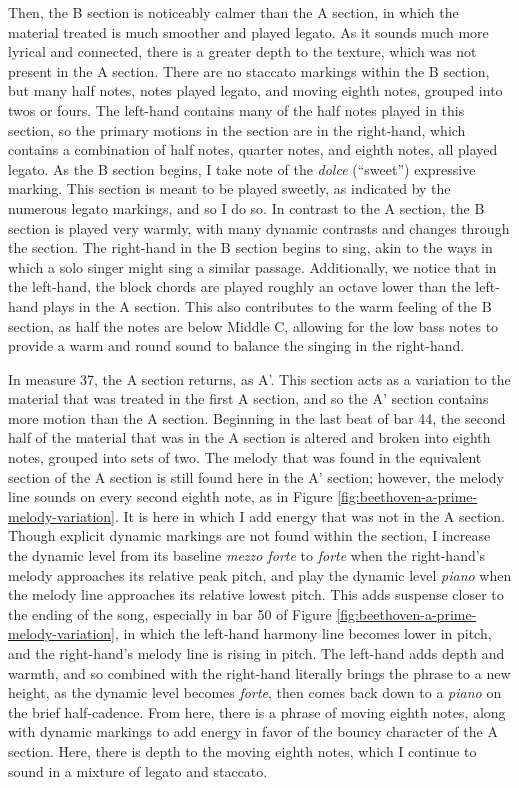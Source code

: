 Then, the B section is noticeably calmer than the A section, in which the material treated is much smoother and played legato. As it sounds much more lyrical and connected, there is a greater depth to the texture, which was not present in the A section. There are no staccato markings within the B section, but many half notes, notes played legato, and moving eighth notes, grouped into twos or fours. The left-hand contains many of the half notes played in this section, so the primary motions in the section are in the right-hand, which contains a combination of half notes, quarter notes, and eighth notes, all played legato. As the B section begins, I take note of the \textit{dolce} (``sweet'') expressive marking. This section is meant to be played sweetly, as indicated by the numerous legato markings, and so I do so. In contrast to the A section, the B section is played very warmly, with many dynamic contrasts and changes through the section. The right-hand in the B section begins to sing, akin to the ways in which a solo singer might sing a similar passage. Additionally, we notice that in the left-hand, the block chords are played roughly an octave lower than the left-hand plays in the A section. This also contributes to the warm feeling of the B section, as half the notes are below Middle C, allowing for the low bass notes to provide a warm and round sound to balance the singing in the right-hand. 

In measure 37, the A section returns, as A'. This section acts as a variation to the material that was treated in the first A section, and so the A' section contains more motion than the A section. Beginning in the last beat of bar 44, the second half of the material that was in the A section is altered and broken into eighth notes, grouped into sets of two. The melody that was found in the equivalent section of the A section is still found here in the A' section; however, the melody line sounds on every second eighth note, as in Figure \ref{fig:beethoven-a-prime-melody-variation}\autocite{Henle_1978}. It is here in which I add energy that was not in the A section. Though explicit dynamic markings are not found within the section, I increase the dynamic level from its baseline \textit{mezzo forte} to \textit{forte} when the right-hand's melody approaches its relative peak pitch, and play the dynamic level \textit{piano} when the melody line approaches its relative lowest pitch. This adds suspense closer to the ending of the song, especially in bar 50 of Figure \ref{fig:beethoven-a-prime-melody-variation}\autocite{Henle_1978}, in which the left-hand harmony line becomes lower in pitch, and the right-hand's melody line is rising in pitch. The left-hand adds depth and warmth, and so combined with the right-hand literally brings the phrase to a new height, as the dynamic level becomes \textit{forte}, then comes back down to a \textit{piano} on the brief half-cadence. From here, there is a phrase of moving eighth notes, along with dynamic markings to add energy in favor of the bouncy character of the A section. Here, there is depth to the moving eighth notes, which I continue to sound in a mixture of legato and staccato. 

